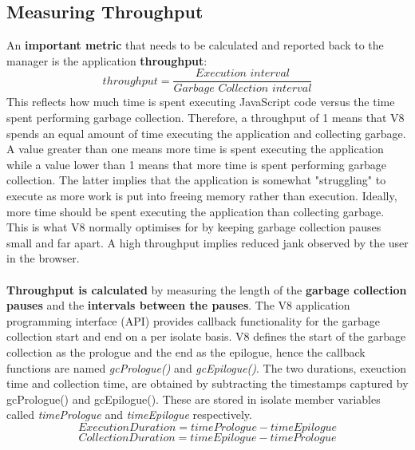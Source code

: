 \documentclass{l4proj}
\begin{document}
\subsection{Measuring Throughput}
\hspace*{3em} An \textbf{important metric} that needs to be calculated and reported back to the manager is the application \textbf{throughput}:
\begin{equation}
throughput = \frac{\textit{Execution interval}}{\textit{Garbage Collection interval}}
\end{equation}
\hspace*{3em} This reflects how much time is spent executing JavaScript code versus the time spent performing garbage collection. Therefore, a throughput of 1 means that V8 spends an equal amount of time executing the application and collecting garbage. A value greater than one means more time is spent executing the application while a value lower than 1 means that more time is spent performing garbage collection. The latter implies that the application is somewhat "struggling" to execute as more work is put into freeing memory rather than execution. Ideally, more time should be spent executing the application than collecting garbage. This is what V8 normally optimises for by keeping garbage collection pauses small and far apart. A high throughput implies reduced jank observed by the user in the browser.
\\\\
\hspace*{3em} \textbf{Throughput is calculated} by measuring the length of the \textbf{garbage collection pauses} and the \textbf{intervals between the pauses}. The V8 application programming interface (API) provides callback functionality for the garbage collection start and end on a per isolate basis. V8 defines the start of the garbage collection as the prologue and the end as the epilogue, hence the callback functions are named \textit{gcPrologue()} and \textit{gcEpilogue()}. The two durations, exeuction time and collection time, are obtained by subtracting the timestamps captured by gcPrologue() and gcEpilogue(). These are stored in isolate member variables called \textit{timePrologue} and \textit{timeEpilogue} respectively. 
\begin{equation}
\textit{ExecutionDuration} = \textit{timePrologue} - \textit{timeEpilogue}
\end{equation}
\begin{equation}
\textit{CollectionDuration} = \textit{timeEpilogue} - \textit{timePrologue}
\end{equation}
\end{document}
